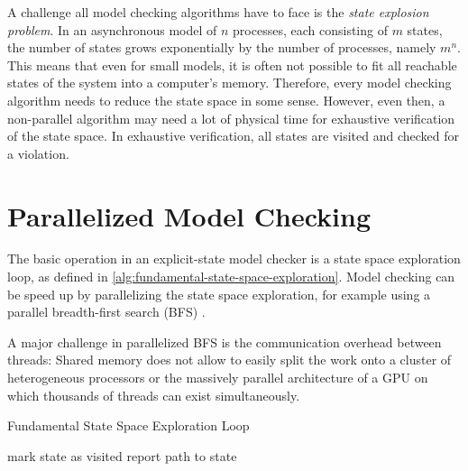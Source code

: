 \documentclass[
fancyheadings, %
%
%
]{stsreprt}
\begin{document}
A challenge all model checking algorithms have to face is the \emph{state explosion problem}.
In an asynchronous model of $n$ processes, each consisting of $m$ states, the number of states grows exponentially by the number of processes, namely $m^n$.
This means that even for small models, it is often not possible to fit all reachable states of the system into a computer's memory.
Therefore, every model checking algorithm needs to reduce the state space in some sense.
However, even then, a non-parallel algorithm may need a lot of physical time for exhaustive verification of the state space.
In exhaustive verification, all states are visited and checked for a violation.
\cite{Clarke2018.Introduction-to-Model-Checking,Holzmann2018.Explicit-State-Model-Checking}

\section{Parallelized Model Checking}
\label{section:background:parallelized-model-checking}

The basic operation in an explicit-state model checker is a state space exploration loop, as defined in \cref{alg:fundamental-state-space-exploration}.
Model checking can be speed up by parallelizing the state space exploration, for example using a parallel breadth-first search (BFS) \cite{Holzmann2012.Paralellizing-SPIN}.

A major challenge in parallelized BFS is the communication overhead between threads:
Shared memory does not allow to easily split the work onto a cluster of heterogeneous processors or the massively parallel architecture of a GPU on which thousands of threads can exist simultaneously.

\begin{algorithm}
    \caption{Fundamental State Space Exploration Loop}
    \label{alg:fundamental-state-space-exploration}
    \begin{algorithmic}
        \State mark state as visited
        \State report path to state
        \EndIf
        \EndWhile
    \end{algorithmic}
\end{algorithm}
\end{document}
